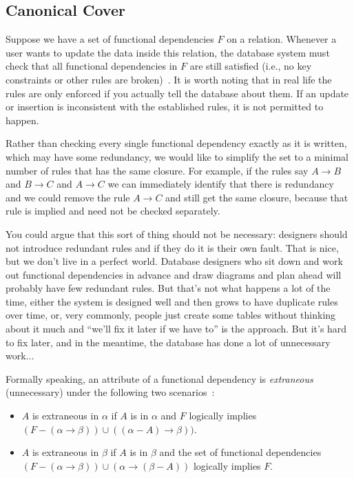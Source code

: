 \documentclass[a4paper]{report}
\begin{document}
\subsection*{Canonical Cover}
Suppose we have a set of functional dependencies $F$ on a relation. Whenever a user wants to update the data inside this relation, the database system must check that all functional dependencies in $F$ are still satisfied (i.e., no key constraints or other rules are broken)~\cite{dsc}. It is worth noting that in real life the rules are only enforced if you actually tell the database about them. If an update or insertion is inconsistent with the established rules, it is not permitted to happen.

Rather than checking every single functional dependency exactly as it is written, which may have some redundancy, we would like to simplify the set to a minimal number of rules that has the same closure. For example, if the rules say $A \rightarrow B$ and $B \rightarrow C$ and $A \rightarrow C$ we can immediately identify that there is redundancy and we could remove the rule $A \rightarrow C$ and still get the same closure, because that rule is implied and need not be checked separately.

You could argue that this sort of thing should not be necessary: designers should not introduce redundant rules and if they do it is their own fault. That is nice, but we don't live in a perfect world. Database designers who sit down and work out functional dependencies in advance and draw diagrams and plan ahead will probably have few redundant rules. But that's not what happens a lot of the time, either the system is designed well and then grows to have duplicate rules over time, or, very commonly, people just create some tables without thinking about it much and ``we'll fix it later if we have to'' is the approach. But it's hard to fix later, and in the meantime, the database has done a lot of unnecessary work...

Formally speaking, an attribute of a functional dependency is \textit{extraneous} (unnecessary) under the following two scenarios~\cite{dsc}:
\begin{itemize}
	\item $A$ is extraneous in $\alpha$ if $A$ is in $\alpha$ and $F$ logically implies $(F - (\alpha \rightarrow \beta)) \cup ((\alpha - A) \rightarrow \beta))$.
	\item $A$ is extraneous in $\beta$ if $A$ is in $\beta$ and the set of functional dependencies $(F - (\alpha \rightarrow \beta)) \cup (\alpha \rightarrow (\beta - A))$ logically implies $F$.
\end{itemize}
\end{document}
